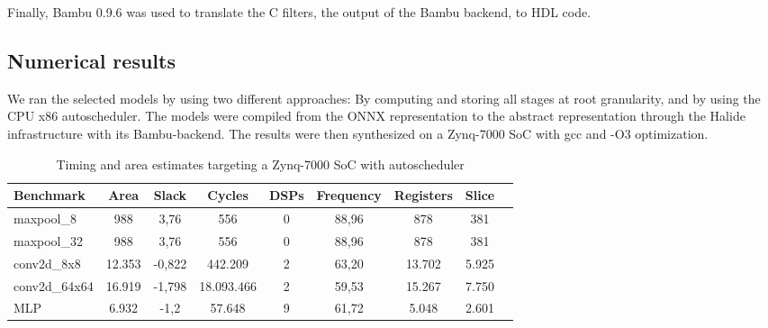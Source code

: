 \documentclass[../main.tex]{subfiles}
\begin{document}
Finally, Bambu 0.9.6 was used to translate the C filters, the output of the Bambu backend, to HDL code.


\subsection{Numerical results}

We ran the selected models by using two different approaches: By computing and storing all stages at root granularity, and by using the CPU x86 autoscheduler.
The models were compiled from the ONNX representation to the abstract representation through the Halide infrastructure with its Bambu-backend.
The results were then synthesized on a Zynq-7000 SoC with gcc and -O3 optimization.

\bigskip

\begin{table}[h]
\centering
\footnotesize
\setlength{\tabcolsep}{4pt}
\begin{tabular}{lcccccccc}
\hline
\textbf{Benchmark} & \textbf{Area} & \textbf{Slack} & \textbf{Cycles} & \textbf{DSPs} & \textbf{Frequency} & \textbf{Registers} & \textbf{Slice} \\ \hline
maxpool\_8       & 988    & 3,76  & 556           & 0             & 88,96              & 878        & 381        \\
maxpool\_32      & 988     & 3,76  & 556           & 0             & 88,96              & 878        & 381         \\
conv2d\_8x8   & 12.353    & -0,822  & 442.209           & 2            & 63,20              & 13.702        & 5.925        \\ 
conv2d\_64x64   & 16.919    & -1,798  & 18.093.466           & 2            & 59,53              & 15.267        & 7.750        \\ 
MLP          & 6.932     & -1,2  & 57.648               & 9             & 61,72              & 5.048        & 2.601        \\
\hline
\end{tabular}
\caption{Timing and area estimates targeting a Zynq-7000 SoC with autoscheduler}
\label{res-table1}
\end{table}

\bigskip
\end{document}
